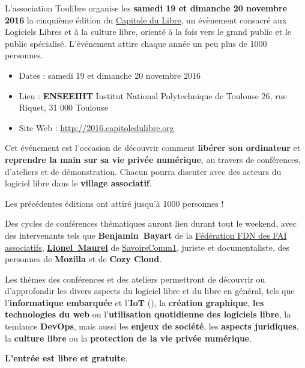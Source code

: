 
\Separateur
\par{\fontsize{14pt}{22pt}\selectfont
  L'association Toulibre organise les \textbf{samedi 19 et dimanche 20 novembre 2016} la cinquième
  édition du \href{http://capitoledulibre.org}{Capitole du Libre},
  un évènement consacré aux Logiciels Libres et à la culture libre,
  orienté à la fois vers le grand public et le public spécialisé.
  L'événement attire chaque année un peu plus de 1000 personnes.
}

\begin{itemize}[label=$\bullet$]
\item Dates : samedi 19 et dimanche 20 novembre 2016
\item Lieu : \textbf{ENSEEIHT} Institut National Polytechnique de Toulouse
26, rue Riquet, 31 000 Toulouse
\item Site Web : \href{http://capitoledulibre.org}{http://2016.capitoledulibre.org}
\end{itemize}

\Separateur

Cet événement est l'occasion de découvrir comment \textbf{libérer son ordinateur}
et \textbf{reprendre la main sur sa vie privée numérique},
au travers de conférences, d'ateliers et de démonstration.
Chacun pourra discuter avec des acteurs du logiciel libre dans le \textbf{village associatif}.

Les précédentes éditions ont attiré jusqu'à 1000 personnes !

\Separateur

Des cycles de conférences thématiques auront lieu durant tout le weekend,
avec des intervenants tels que \textbf{\mbox{Benjamin Bayart}} de la \href{http://ffdn.org/}{Fédération FDN des FAI associatifs},
\textbf{\href{http://scinfolex.com/}{\mbox{Lionel Maurel}}} de \href{http://savoirscom1.info/}{SavoirsComm1}, juriste et documentaliste,
des personnes de \textbf{Mozilla} et de \textbf{Cozy Cloud}.

\Separateur

Les thèmes des conférences et des ateliers permettront de découvrir ou d'approfondir
les divers aspects du logiciel libre et du libre en général, tels que 
l'\textbf{informatique embarquée} et l'\textbf{IoT} (), la \textbf{création graphique},
\textbf{les technologies du web} ou l'\textbf{utilisation quotidienne des logiciels libre}, la tendance \textbf{DevOps},
mais aussi les \textbf{enjeux de société}, les \textbf{aspects juridiques},
la \textbf{culture libre} ou la \textbf{protection de la vie privée numérique}.

\Separateur

\textbf{L'entrée est libre et gratuite}.

